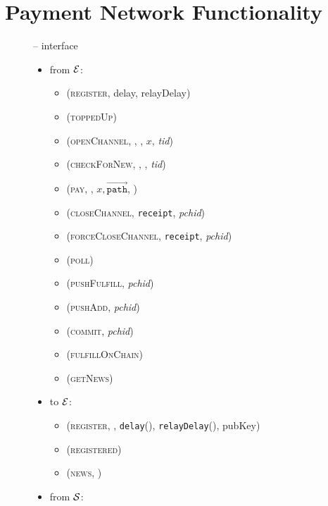 \section{Payment Network Functionality}
  \label{appendix:payfunc}
  \begin{figure}[H]
    \begin{systembox}{\fpaynet{} -- interface}
      \begin{itemize}
        \item from $\mathcal{E}$:
        \begin{itemize}
          \item (\textsc{register}, delay, relayDelay)
          \item (\textsc{toppedUp})
          \item (\textsc{openChannel}, \alice, \bob, $x$, \textit{tid})
          \item (\textsc{checkForNew}, \alice, \bob, \textit{tid})
          \item (\textsc{pay}, \bob, $x, \overrightarrow{\mathtt{path}}$,
          )
          \item (\textsc{closeChannel}, \texttt{receipt}, \textit{pchid})
          \item (\textsc{forceCloseChannel}, \texttt{receipt}, \textit{pchid})
          \item (\textsc{poll})
          \item (\textsc{pushFulfill}, \textit{pchid})
          \item (\textsc{pushAdd}, \textit{pchid})
          \item (\textsc{commit}, \textit{pchid})
          \item (\textsc{fulfillOnChain})
          \item (\textsc{getNews})
        \end{itemize}
        \item to $\mathcal{E}$:
        \begin{itemize}
          \item (\textsc{register}, \alice, \texttt{delay}(\alice),
          \texttt{relayDelay}(\alice), pubKey)
          \item (\textsc{registered})
          \item (\textsc{news}, )
        \end{itemize}
        \item from $\mathcal{S}$:

\end{itemize}
\end{systembox}
\end{figure}

